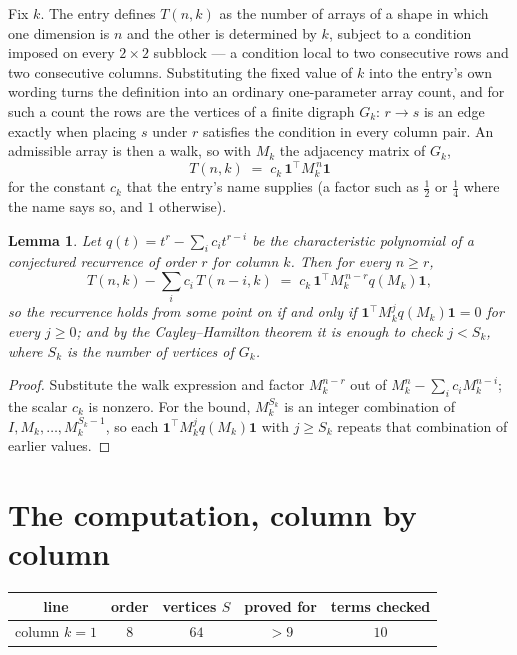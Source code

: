 \documentclass[11pt,a4paper]{article}
\theoremstyle{plain}
\newtheorem{lemma}[theorem]{Lemma}
\theoremstyle{definition}
\begin{document}
Fix $k$. The entry defines $T(n,k)$ as the number of arrays of a shape in which one dimension
is $n$ and the other is determined by $k$, subject to a condition imposed on every
$2\times2$ subblock --- a condition local to two consecutive rows and two consecutive columns.
Substituting the fixed value of $k$ into the entry's own wording turns the definition into an
ordinary one-parameter array count, and for such a count the rows are the vertices of a finite
digraph $G_k$: $r\to s$ is an edge exactly when placing $s$ under $r$ satisfies the condition
in every column pair. An admissible array is then a walk, so with $M_k$ the adjacency matrix
of $G_k$,
\[
T(n,k)\;=\;c_k\,\mathbf{1}^{\!\top}M_k^{\,n}\mathbf{1}
\]
for the constant $c_k$ that the entry's name supplies (a factor such as $\tfrac12$ or
$\tfrac14$ where the name says so, and $1$ otherwise).

\begin{lemma}\label{lem:crit}
Let $q(t)=t^{r}-\sum_i c_it^{r-i}$ be the characteristic polynomial of a conjectured
recurrence of order $r$ for column $k$. Then for every $n\ge r$,
\[
T(n,k)-\sum_i c_i\,T(n-i,k)\;=\;c_k\,\mathbf{1}^{\!\top}M_k^{\,n-r}q(M_k)\mathbf{1},
\]
so the recurrence holds from some point on if and only if
$\mathbf{1}^{\!\top}M_k^{j}q(M_k)\mathbf{1}=0$ for every $j\ge0$; and by the
Cayley--Hamilton theorem it is enough to check $j<S_k$, where $S_k$ is the number of vertices
of $G_k$.
\end{lemma}

\begin{proof}
Substitute the walk expression and factor $M_k^{n-r}$ out of $M_k^{n}-\sum_ic_iM_k^{n-i}$;
the scalar $c_k$ is nonzero. For the bound, $M_k^{S_k}$ is an integer combination of
$I,M_k,\dots,M_k^{S_k-1}$, so each $\mathbf{1}^{\!\top}M_k^{j}q(M_k)\mathbf{1}$ with
$j\ge S_k$ repeats that combination of earlier values.
\end{proof}

\section{The computation, column by column}

\begin{center}
\begin{tabular}{ccccc}
line & order & vertices $S$ & proved for & terms checked \\ \hline
column $k$$=1$ & $8$ & $64$ & $>9$ & $10$ \\
\end{tabular}
\end{center}
\end{document}
